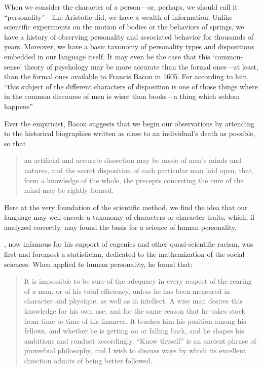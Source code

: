 When we consider the character of a person---or, perhaps, we should call it ``personality''---like Aristotle did, we have a wealth of information. Unlike scientific experiments on the motion of bodies or the behaviors of springs, we have a history of observing personality and associated behavior for thousands of years. Moreover, we have a basic taxonomy of personality types and dispositions embedded in our language itself. It may even be the case that this `common-sense' theory of psychology may be more accurate than the formal ones---at least, than the formal ones available to Francis Bacon in 1605. For according to him, ``this subject of the different characters of disposition is one of those things where in the common discourse of men is wiser than books---a thing which seldom happens'' ~\citep[Book VII, Ch 3, p. 324--5]{Bacon:-1vg}

Ever the empiricist, Bacon suggests that we begin our observations by attending to the historical biographies written as close to an individual's death as possible, so that

\begin{quote}

an artificial and accurate dissection may be made of men's minds and natures, and the secret disposition of each particular man laid open, that, form a knowledge of the whole, the precepts concreting the cure of the mind may be rightly formed. ~\citep[p. 325]{Bacon:-1vg}
\end{quote}

Here at the very foundation of the scientific method, we find the idea that our language may well encode a taxonomy of characters or character traits, which, if analyzed correctly, may found the basis for a science of human personality.

, now infamous for his support of eugenics and other quasi-scientific racism, was first and foremost a statistician, dedicated to the mathemization of the social sciences. When applied to human personality, he found that:

\begin{quote}

It is impossible to be sure of the adequacy in every respect of the rearing of a man, or of his total efficiency, unless he has been measured in character and physique, as well as in intellect. A wise man desires this knowledge for his own use, and for the same reason that he takes stock from time to time of his finances. It teaches him his position among his fellows, and whether he is getting on or falling back, and he shapes his ambitions and conduct accordingly. ``Know thyself'' is an ancient phrase of proverbial philosophy, and I wish to discuss ways by which its excellent direction admits of being better followed. ~\citep[p. 179]{Galton:1884ub}
\end{quote}

